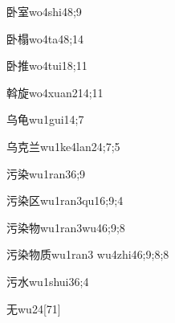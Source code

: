 \begin{verbete}{卧室}{wo4shi4}{8;9}
\end{verbete}

\begin{verbete}{卧榻}{wo4ta4}{8;14}
\end{verbete}

\begin{verbete}{卧推}{wo4tui1}{8;11}
\end{verbete}

\begin{verbete}{斡旋}{wo4xuan2}{14;11}
\end{verbete}

\begin{verbete}{乌龟}{wu1gui1}{4;7}
\end{verbete}

\begin{verbete}{乌克兰}{wu1ke4lan2}{4;7;5}
\end{verbete}

\begin{verbete}{污染}{wu1ran3}{6;9}
\end{verbete}

\begin{verbete}{污染区}{wu1ran3qu1}{6;9;4}
\end{verbete}

\begin{verbete}{污染物}{wu1ran3wu4}{6;9;8}
\end{verbete}

\begin{verbete}{污染物质}{wu1ran3 wu4zhi4}{6;9;8;8}
\end{verbete}

\begin{verbete}{污水}{wu1shui3}{6;4}
\end{verbete}

\begin{verbete}{无}{wu2}{4}[71]
\end{verbete}

